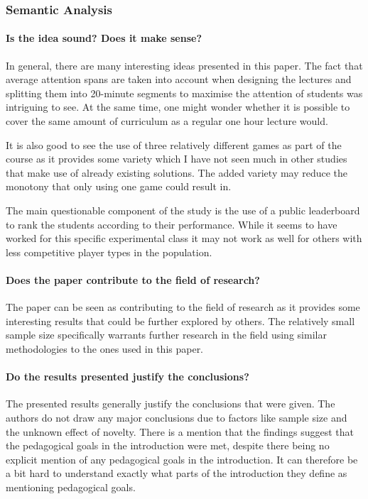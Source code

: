 \subsubsection{Semantic Analysis}
\paragraph{Is the idea sound? Does it make sense?}
In general, there are many interesting ideas presented in this paper. The fact that average attention spans are taken into account when designing the lectures and splitting them into 20-minute segments to maximise the attention of students was intriguing to see. At the same time, one might wonder whether it is possible to cover the same amount of curriculum as a regular one hour lecture would. 

It is also good to see the use of three relatively different games as part of the course as it provides some variety which I have not seen much in other studies that make use of already existing solutions. The added variety may reduce the monotony that only using one game could result in.  

The main questionable component of the study is the use of a public leaderboard to rank the students according to their performance. While it seems to have worked for this specific experimental class it may not work as well for others with less competitive player types in the population. 

\paragraph{Does the paper contribute to the field of research?}
The paper can be seen as contributing to the field of research as it provides some interesting results that could be further explored by others. The relatively small sample size specifically warrants further research in the field using similar methodologies to the ones used in this paper. 

\paragraph{Do the results presented justify the conclusions?}
The presented results generally justify the conclusions that were given. The authors do not draw any major conclusions due to factors like sample size and the unknown effect of novelty. There is a mention that the findings suggest that the pedagogical goals in the introduction were met, despite there being no explicit mention of any pedagogical goals in the introduction. It can therefore be a bit hard to understand exactly what parts of the introduction they define as mentioning pedagogical goals.  


